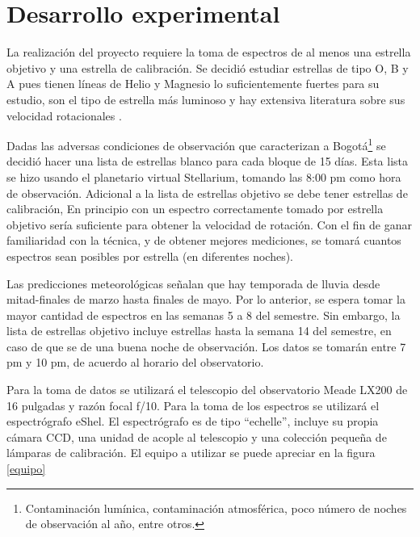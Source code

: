 \documentclass[notitlepage,letterpaper,12pt]{article} %
\begin{document}
\section{Desarrollo experimental}
La realización del proyecto requiere la toma de espectros de al menos una estrella objetivo y una estrella de calibración. Se decidió estudiar estrellas de tipo O, B y A pues tienen líneas de Helio y Magnesio lo suficientemente fuertes para su estudio, son el tipo de estrella más luminoso y hay extensiva literatura sobre sus velocidad rotacionales \cite{syntetic} \cite{rotOfB} \cite{2004IAUS..224..109R}.

Dadas las adversas condiciones de observación que caracterizan a Bogotá\footnote{Contaminación lumínica, contaminación atmosférica, poco número de noches de observación al año, entre otros.} se decidió hacer una lista de estrellas blanco para cada bloque de 15 días. Esta lista se hizo usando el planetario virtual Stellarium, tomando las 8:00 pm como hora de observación.
Adicional a la lista de estrellas objetivo se debe tener estrellas de calibración, %
En principio con un espectro correctamente tomado por estrella objetivo sería suficiente para obtener la velocidad de rotación. Con el fin de ganar familiaridad con la técnica, y de obtener mejores mediciones, se tomará cuantos espectros sean posibles por estrella (en diferentes noches). %

Las predicciones meteorológicas señalan que hay temporada de lluvia desde mitad-finales de marzo hasta finales de mayo. Por lo anterior, se espera tomar la mayor cantidad de espectros en las semanas 5 a 8 del semestre. Sin embargo, la lista de estrellas objetivo incluye estrellas hasta la semana 14 del semestre, en caso de que se de una buena noche de observación. Los datos se tomarán entre 7 pm y 10 pm, de acuerdo al horario del observatorio. 

Para la toma de datos se utilizará el telescopio del observatorio Meade LX200 de 16 pulgadas y razón focal f/10. Para la toma de los espectros se utilizará el espectrógrafo eShel. El espectrógrafo es de tipo \enquote{echelle}, incluye su propia cámara CCD, una unidad de acople al telescopio y una colección pequeña de lámparas de calibración. El equipo a utilizar se puede apreciar en la figura \ref{equipo}
\end{document}
